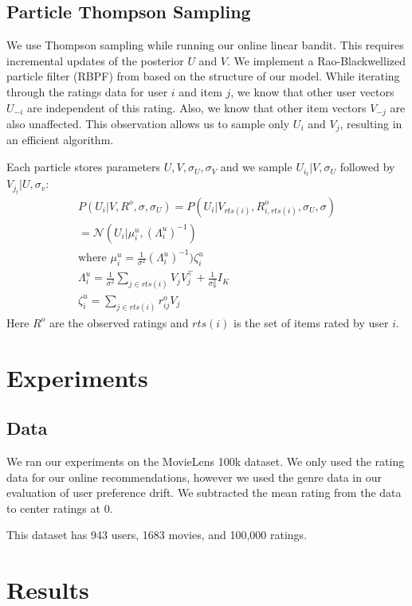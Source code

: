 \documentclass{article}
\begin{document}
\subsection{Particle Thompson Sampling}
We use Thompson sampling while running our online linear bandit. This requires incremental updates
of the posterior $U$ and $V$. We implement a Rao-Blackwellized particle filter (RBPF) from
\cite{kawale2015efficient} based on the structure of our model. While iterating through the
ratings data for user $i$ and item $j$, we know that other user vectors $U_{-i}$ are independent
of this rating. Also, we know that other item vectors $V_{-j}$ are also unaffected. This
observation allows us to sample only $U_i$ and $V_j$, resulting in an efficient algorithm.

Each particle stores parameters $U, V, \sigma_U, \sigma_V$ and we sample $U_{i_t}|V, \sigma_U$
followed by $V_{j_t}|U, \sigma_v$:
\begin{gather*}
P(U_i | V, R^o, \sigma, \sigma_U) = P(U_i | V_{rts(i)}, R^o_{i, rts(i)}, \sigma_U, \sigma) \\
= \mathcal{N}(U_i | \mu^u_i, (\Lambda_i^u)^{-1}) \\
\text{where } \mu_i^u = \frac{1}{\sigma^2}(\Lambda_i^u)^{-1})\zeta_i^u \\
\Lambda_i^u = \frac{1}{\sigma^2} \sum_{j \in rts(i)} V_j V_j^{\top} + \frac{1}{\sigma_u^2}I_K \\
\zeta_i^u = \sum_{j \in rts(i)} r_{ij}^o V_j
\end{gather*}
Here $R^o$ are the observed ratings and $rts(i)$ is the set of items rated by user $i$.

\section{Experiments}

\subsection{Data}
We ran our experiments on the MovieLens 100k dataset. We only used the rating data for our
online recommendations, however we used the genre data in our evaluation of user preference
drift. We subtracted the mean rating from the data to center ratings at 0.

This dataset has 943 users, 1683 movies, and 100,000 ratings.

\section{Results}
\end{document}
